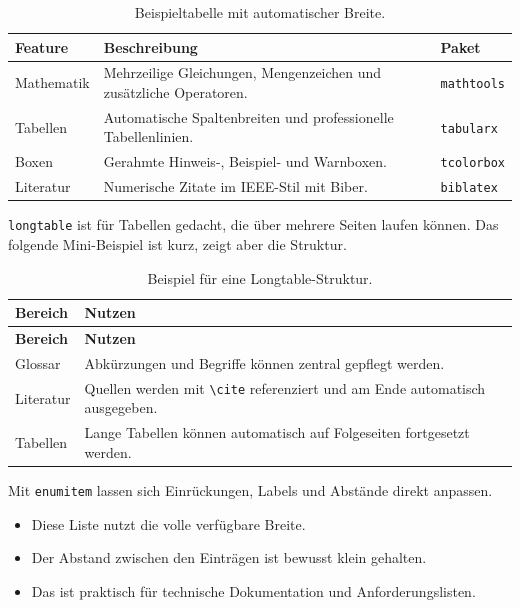 \documentclass[12pt,a4paper]{article}
\begin{document}
\begin{Content}
	\begin{table}[H]
		\centering
		\caption{Beispieltabelle mit automatischer Breite.}
		\label{tab:features}
		\begin{tabularx}{\textwidth}{@{}L{0.28\textwidth}Y C{0.18\textwidth}@{}}
			\toprule
			\textbf{Feature} & \textbf{Beschreibung} & \textbf{Paket} \\
			\midrule
			Mathematik & Mehrzeilige Gleichungen, Mengenzeichen und zusätzliche Operatoren. & \texttt{mathtools} \\
			Tabellen & Automatische Spaltenbreiten und professionelle Tabellenlinien. & \texttt{tabularx} \\
			Boxen & Gerahmte Hinweis-, Beispiel- und Warnboxen. & \texttt{tcolorbox} \\
			Literatur & Numerische Zitate im IEEE-Stil mit Biber. & \texttt{biblatex} \\
			\bottomrule
		\end{tabularx}
	\end{table}

	\texttt{longtable} ist für Tabellen gedacht, die über mehrere Seiten laufen können. Das folgende Mini-Beispiel ist kurz, zeigt aber die Struktur.

	\begin{longtable}{@{}L{0.28\textwidth}L{0.62\textwidth}@{}}
		\caption{Beispiel für eine Longtable-Struktur.}\label{tab:longtable-demo}\\
		\toprule
		\textbf{Bereich} & \textbf{Nutzen} \\
		\midrule
		\endfirsthead
		\toprule
		\textbf{Bereich} & \textbf{Nutzen} \\
		\midrule
		\endhead
		Glossar & Abkürzungen und Begriffe können zentral gepflegt werden. \\
		Literatur & Quellen werden mit \verb|\cite| referenziert und am Ende automatisch ausgegeben. \\
		Tabellen & Lange Tabellen können automatisch auf Folgeseiten fortgesetzt werden. \\
		\bottomrule
	\end{longtable}

	Mit \texttt{enumitem} lassen sich Einrückungen, Labels und Abstände direkt anpassen.

	\begin{itemize}[leftmargin=*, itemsep=0.3em]
		\item Diese Liste nutzt die volle verfügbare Breite.
		\item Der Abstand zwischen den Einträgen ist bewusst klein gehalten.
		\item Das ist praktisch für technische Dokumentation und Anforderungslisten.
	\end{itemize}


\end{Content}
\end{document}
